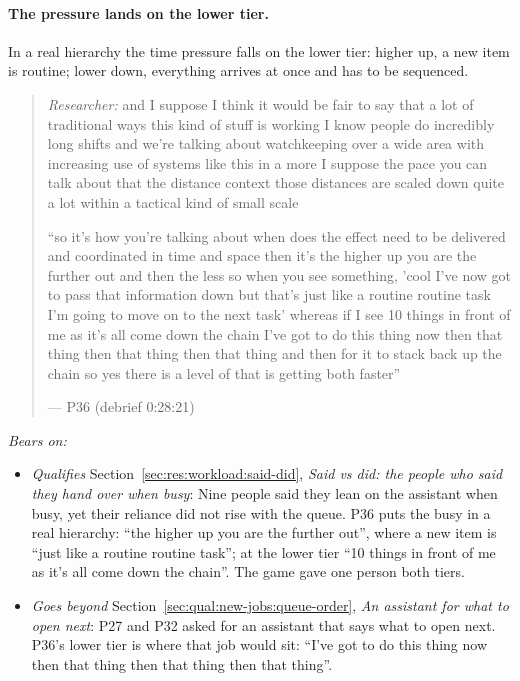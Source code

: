 
\label{sec:qual:practitioner:pt-tempo-echelon}\paragraph{The pressure lands on the lower tier.}
In a real hierarchy the time pressure falls on the lower tier: higher up, a new item is routine; lower down, everything arrives at once and has to be sequenced.

\begin{quote}\small
{\footnotesize\textit{Researcher:} and I suppose I think it would be fair to say that a lot of traditional ways this kind of stuff is working I know people do incredibly long shifts and we're talking about watchkeeping over a wide area with increasing use of systems like this in a more I suppose the pace you can talk about that the distance context those distances are scaled down quite a lot within a tactical kind of small scale}\par\smallskip
``so it's how you're talking about when does the effect need to be delivered and coordinated in time and space then it's the higher up you are the further out and then the less so when you see something, 'cool I've now got to pass that information down but that's just like a routine routine task I'm going to move on to the next task' whereas if I see 10 things in front of me as it's all come down the chain I've got to do this thing now then that thing then that thing then that thing and then for it to stack back up the chain so yes there is a level of that is getting both faster''\par\hfill--- P36 (debrief 0:28:21)
\end{quote}

\noindent\textit{Bears on:}
\begin{itemize}[leftmargin=1.2em,itemsep=1pt]\small
\item \textit{Qualifies} Section~\ref{sec:res:workload:said-did}, \emph{Said vs did: the people who said they hand over when busy}: Nine people said they lean on the assistant when busy, yet their reliance did not rise with the queue. P36 puts the busy in a real hierarchy: ``the higher up you are the further out'', where a new item is ``just like a routine routine task''; at the lower tier ``10 things in front of me as it's all come down the chain''. The game gave one person both tiers.
\item \textit{Goes beyond} Section~\ref{sec:qual:new-jobs:queue-order}, \emph{An assistant for what to open next}: P27 and P32 asked for an assistant that says what to open next. P36's lower tier is where that job would sit: ``I've got to do this thing now then that thing then that thing then that thing''.
\end{itemize}

